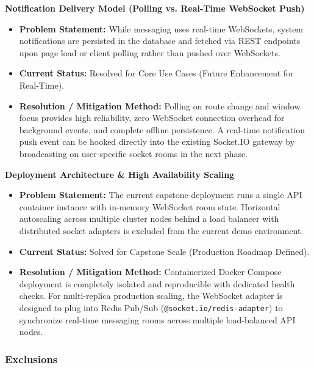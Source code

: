 \begin{description}[leftmargin=2.0cm,labelwidth=1.8cm,align=left,font=\normalfont\bfseries]
\item[LI-12] \textbf{Notification Delivery Model (Polling vs. Real-Time WebSocket Push)}
\begin{itemize}[leftmargin=0.5cm, label=--]
\item \textbf{Problem Statement:} While messaging uses real-time WebSockets, system notifications are persisted in the database and fetched via REST endpoints upon page load or client polling rather than pushed over WebSockets.
\item \textbf{Current Status:} Resolved for Core Use Cases (Future Enhancement for Real-Time).
\item \textbf{Resolution / Mitigation Method:} Polling on route change and window focus provides high reliability, zero WebSocket connection overhead for background events, and complete offline persistence. A real-time notification push event can be hooked directly into the existing Socket.IO gateway by broadcasting on user-specific socket rooms in the next phase.
\end{itemize}

\item[LI-13] \textbf{Deployment Architecture \& High Availability Scaling}
\begin{itemize}[leftmargin=0.5cm, label=--]
\item \textbf{Problem Statement:} The current capstone deployment runs a single API container instance with in-memory WebSocket room state. Horizontal autoscaling across multiple cluster nodes behind a load balancer with distributed socket adapters is excluded from the current demo environment.
\item \textbf{Current Status:} Solved for Capstone Scale (Production Roadmap Defined).
\item \textbf{Resolution / Mitigation Method:} Containerized Docker Compose deployment is completely isolated and reproducible with dedicated health checks. For multi-replica production scaling, the WebSocket adapter is designed to plug into Redis Pub/Sub (\texttt{@socket.io/redis-adapter}) to synchronize real-time messaging rooms across multiple load-balanced API nodes.
\end{itemize}

\end{description}

\subsubsection{Exclusions}

